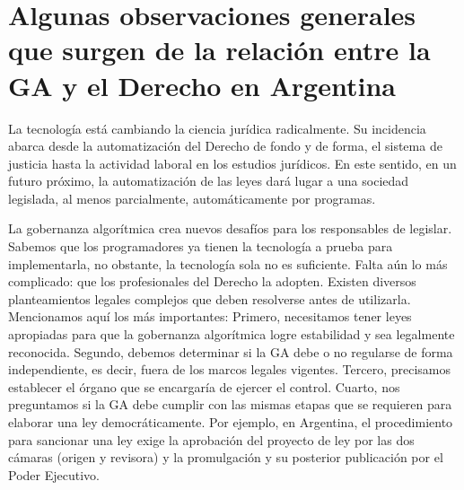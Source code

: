 \documentclass[12pt]{report} %
\begin{document}
\section{Algunas observaciones generales que surgen de la relación entre la GA y el Derecho en Argentina}

La tecnología está cambiando la ciencia jurídica radicalmente. Su incidencia abarca desde la automatización del Derecho de fondo y de forma, el sistema de justicia hasta la actividad laboral en los estudios jurídicos. En este sentido, en un futuro próximo, la automatización de las leyes dará lugar a una sociedad legislada, al menos parcialmente, automáticamente por programas. 

La gobernanza algorítmica crea nuevos desafíos para los responsables de legislar. Sabemos que los programadores ya tienen la tecnología a prueba para implementarla, no obstante, la tecnología sola no es suficiente. Falta aún lo más complicado: que los profesionales del Derecho la adopten. Existen diversos planteamientos legales complejos que deben resolverse antes de utilizarla. Mencionamos aquí los más importantes: Primero, necesitamos tener leyes apropiadas para que la gobernanza algorítmica logre estabilidad y sea legalmente reconocida. Segundo, debemos determinar si la GA debe o no regularse de forma independiente, es decir, fuera de los marcos legales vigentes. Tercero, precisamos establecer el órgano que se encargaría de ejercer el control. Cuarto, nos preguntamos si la GA debe cumplir con las mismas etapas que se requieren para elaborar una ley democráticamente. Por ejemplo, en Argentina, el procedimiento para sancionar una ley exige la aprobación del proyecto de ley por las dos cámaras (origen y revisora) y la promulgación y su posterior publicación por el Poder Ejecutivo. 
\end{document}
